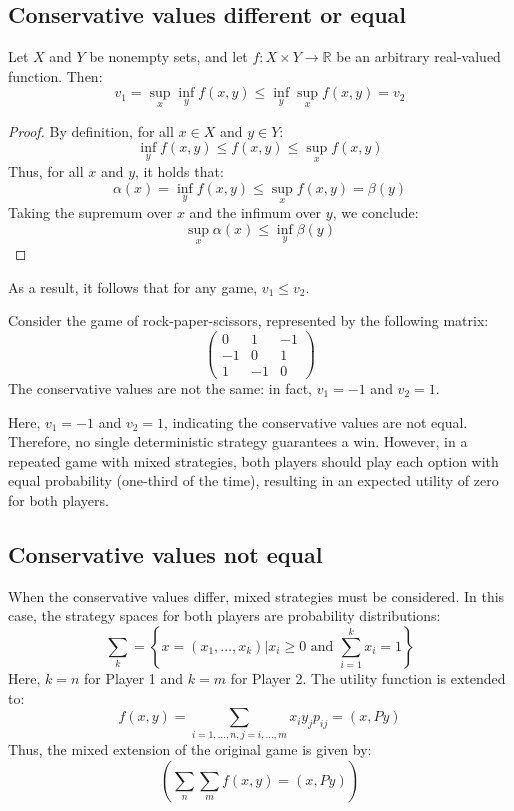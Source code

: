 \subsection{Conservative values different or equal}
\begin{proposition}
    Let $X$ and $Y$ be nonempty sets, and let $f : X \times Y \rightarrow \mathbb{R}$ be an arbitrary real-valued function.
    Then: 
    \[v_1 = \sup_x\inf_yf (x, y) \leq \inf_y\sup_xf (x, y) = v_2\]
\end{proposition}
\begin{proof}
    By definition, for all $x \in X$ and $y \in Y$:
    \[\inf_yf(x, y) \leq f (x, y) \leq \sup_xf (x, y)\]
    Thus, for all $x$ and $y$, it holds that:
    \[\alpha(x) = \inf_yf (x, y) \leq \sup_xf (x, y) = \beta(y)\]
    Taking the supremum over $x$ and the infimum over $y$, we conclude:
    \[\sup_x\alpha(x) \leq \inf_y\beta(y)\]
\end{proof}
As a result, it follows that for any game, $v_1 \leq v_2$.
\begin{example}
    Consider the game of rock-paper-scissors, represented by the following matrix:
    \[\begin{pmatrix} 0 & 1 & -1 \\ -1 & 0 & 1 \\ 1 & -1 & 0 \end{pmatrix}\]
    The conservative values are not the same: in fact, $v_1 = -1$ and $v_2 = 1$. 

    Here, $v_1 = -1$ and $v_2 = 1$, indicating the conservative values are not equal. 
    Therefore, no single deterministic strategy guarantees a win. 
    However, in a repeated game with mixed strategies, both players should play each option with equal probability (one-third of the time), resulting in an expected utility of zero for both players.
\end{example}

\subsection{Conservative values not equal}
When the conservative values differ, mixed strategies must be considered. 
In this case, the strategy spaces for both players are probability distributions:
\[\sum_k=\left\{x=(x_1,\dots,x_k)|x_i\geq 0 \text{ and }\sum_{i=1}^{k}x_i=1\right\}\]
Here, $k = n$ for Player 1 and $k = m$ for Player 2. 
The utility function is extended to:
\[f(x,y)=\sum_{i=1,\dots,n,j=i,\dots,m}x_iy_jp_{ij}=(x,Py)\]
Thus, the mixed extension of the original game is given by:
\[\left(\sum_n \sum_m f (x, y) = (x, Py)\right)\]

